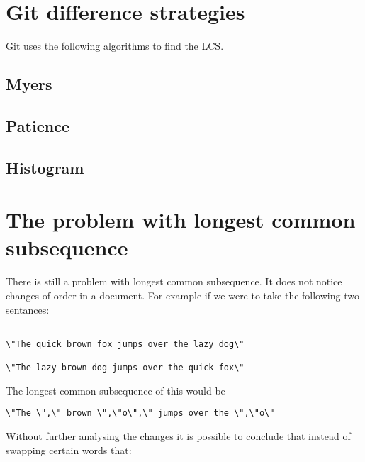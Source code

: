 \section{Git difference strategies}
Git uses the following algorithms to find the LCS.
\subsection{Myers}
\subsection{Patience}
\subsection{Histogram}

\section{The problem with longest common subsequence}
There is still a problem with longest common subsequence. It does not notice changes of order in a document.  For example if we were to take the following two sentances:

\begin{verbatim}

\"The quick brown fox jumps over the lazy dog\"

\"The lazy brown dog jumps over the quick fox\"

\end{verbatim}

The longest common subsequence of this would be

\begin{verbatim}
\"The \",\" brown \",\"o\",\" jumps over the \",\"o\"
\end{verbatim}

Without further analysing the changes it is possible to conclude that instead of swapping certain words that:

